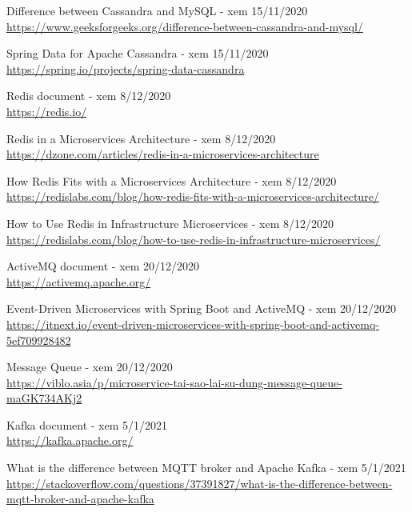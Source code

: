 \documentclass[12pt,a4paper,oneside]{book}
\begin{document}
\begin{thebibliography}{80}
        \bibitem{} Difference between Cassandra and MySQL - xem 15/11/2020\\
        \url{https://www.geeksforgeeks.org/difference-between-cassandra-and-mysql/}
        
        \bibitem{} Spring Data for Apache Cassandra - xem 15/11/2020\\
        \url{https://spring.io/projects/spring-data-cassandra}
        
        \bibitem{} Redis document - xem 8/12/2020\\
        \url{https://redis.io/}
        
        \bibitem{} Redis in a Microservices Architecture - xem 8/12/2020\\
        \url{https://dzone.com/articles/redis-in-a-microservices-architecture}
        
        \bibitem{} How Redis Fits with a Microservices Architecture - xem 8/12/2020\\
        \url{https://redislabs.com/blog/how-redis-fits-with-a-microservices-architecture/}
        
        \bibitem{} How to Use Redis in Infrastructure Microservices - xem 8/12/2020\\
        \url{https://redislabs.com/blog/how-to-use-redis-in-infrastructure-microservices/}
        
        \bibitem{} ActiveMQ document - xem 20/12/2020\\
        \url{https://activemq.apache.org/}
        
        \bibitem{} Event-Driven Microservices with Spring Boot and ActiveMQ - xem 20/12/2020\\
        \url{https://itnext.io/event-driven-microservices-with-spring-boot-and-activemq-5ef709928482}
		
        \bibitem{} Message Queue - xem 20/12/2020\\
        \url{https://viblo.asia/p/microservice-tai-sao-lai-su-dung-message-queue-maGK734AKj2}
        
        \bibitem{} Kafka document - xem 5/1/2021\\
        \url{https://kafka.apache.org/}
        
        \bibitem{} What is the difference between MQTT broker and Apache Kafka - xem 5/1/2021\\
        \url{https://stackoverflow.com/questions/37391827/what-is-the-difference-between-mqtt-broker-and-apache-kafka}
        

\end{thebibliography}
\end{document}
